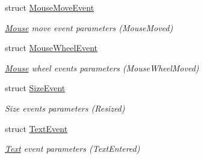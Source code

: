 \begin{DoxyCompactItemize}
struct \hyperlink{structsf_1_1_event_1_1_mouse_move_event}{Mouse\+Move\+Event}
\begin{DoxyCompactList}\small\item\em \hyperlink{classsf_1_1_mouse}{Mouse} move event parameters (Mouse\+Moved) \end{DoxyCompactList}\item 
struct \hyperlink{structsf_1_1_event_1_1_mouse_wheel_event}{Mouse\+Wheel\+Event}
\begin{DoxyCompactList}\small\item\em \hyperlink{classsf_1_1_mouse}{Mouse} wheel events parameters (Mouse\+Wheel\+Moved) \end{DoxyCompactList}\item 
struct \hyperlink{structsf_1_1_event_1_1_size_event}{Size\+Event}
\begin{DoxyCompactList}\small\item\em Size events parameters (Resized) \end{DoxyCompactList}\item 
struct \hyperlink{structsf_1_1_event_1_1_text_event}{Text\+Event}
\begin{DoxyCompactList}\small\item\em \hyperlink{classsf_1_1_text}{Text} event parameters (Text\+Entered) \end{DoxyCompactList}\end{DoxyCompactItemize}
